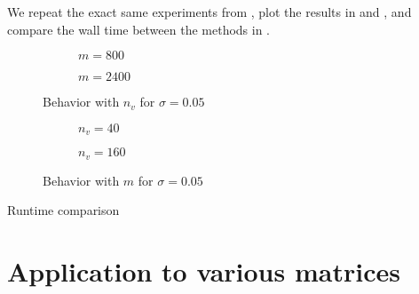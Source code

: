 We repeat the exact same experiments from ,
plot the results in  and
, and compare the wall time
between the methods in .

\begin{figure}[ht]
    \begin{subfigure}[b]{0.45\columnwidth}
        
        \caption{$m=800$}
        \label{fig:5-experiments-haydock-convergence-nv-m800}
    \end{subfigure}
    \begin{subfigure}[b]{0.5\columnwidth}
        
        \caption{$m=2400$}
        \label{fig:5-experiments-haydock-convergence-nv-m2400}
    \end{subfigure}
    \caption{Behavior with $n_v$ for $\sigma=0.05$}
    \label{fig:5-experiments-haydock-convergence-nv}
\end{figure}

\begin{figure}[ht]
    \centering
    \begin{subfigure}[b]{0.45\columnwidth}
        
        \caption{$n_v=40$}
        \label{fig:5-experiments-haydock-convergence-m-nv40}
    \end{subfigure}
    \begin{subfigure}[b]{0.5\columnwidth}
        
        \caption{$n_v=160$}
        \label{fig:5-experiments-haydock-convergence-m-nv160}
    \end{subfigure}
    \caption{Behavior with $m$ for $\sigma=0.05$}
    \label{fig:5-experiments-haydock-convergence-m}
\end{figure}

\begin{table}[ht]
    \caption{Runtime comparison}
    \label{tab:5-experiments-timing-haydock}
   
\end{table}


\section{Application to various matrices}
\label{sec:5-experiments-various-matrices}


